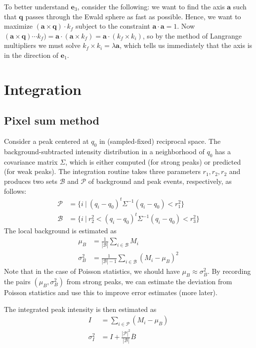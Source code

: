 \documentclass{report}
\newcommand{\calP}{\mathcal{P}}
\newcommand{\calB}{\mathcal{B}}
\newcommand{\ba}{\mathbf{a}}
\newcommand{\be}{\mathbf{e}}
\newcommand{\bq}{\mathbf{q}}
\begin{document}
To better understand $\be_3$, consider the following: we want to find the axis $\ba$ such that $\bq$ passes through the Ewald sphere as fast as possible. Hence, we want to maximize $(\ba \times \bq) \cdot k_f$ subject to the constraint $\ba \cdot \ba = 1$.
Now $(\ba \times \bq) \cdots k_f) = \ba \cdot (\ba \times k_f) = \ba \cdot (k_f \times k_i)$, so by the method of Langrange multipliers we must solve $k_f \times k_i = \lambda \ba$, which tells us immediately that the axis is in the direction of $\be_1$.


\chapter{Integration}

\section{Pixel sum method}
Consider a peak centered at $q_0$ in (sampled-fixed) reciprocal space. The background-subtracted intensity distribution in a neighborhood of $q_0$ has a covariance matrix $\Sigma$, which is either computed (for strong peaks) or predicted (for weak peaks). The integration routine takes three parameters $r_1, r_2, r_2$ and produces
two sets $\calB$ and $\calP$ of background and peak events, respectively, as follows:
\begin{align*}
  \calP &= \{ i \ | \ (q_i-q_0)^t \Sigma^{-1} (q_i-q_0) < r_1^2 \} \\
  \calB &= \{ i \ | \ r_2^2 < (q_i-q_0)^t \Sigma^{-1} (q_i-q_0) < r_3^2 \}
\end{align*}
The local background is estimated as
\begin{align*}
  \mu_B &= \frac{1}{|\calB|} \sum_{i \in \calB} M_i \\
  \sigma^2_B &= \frac{1}{|\calB|-1} \sum_{i \in \calB} (M_i - \mu_B)^2
\end{align*}
Note that in the case of Poisson statistics, we should have $\mu_B \approx \sigma^2_B$. By recording the pairs $(\mu_B, \sigma^2_B)$ from strong peaks, we can estimate the deviation from Poisson statistics and use this to improve error estimates (more later).

The integrated peak intensity is then estimated as
\begin{align*}
  I &= \sum_{i \in \calP} (M_i - \mu_B) \\
  \sigma^2_I &= I + \frac{|\calP|^2}{|\calB|} \overline{B}
\end{align*}
\end{document}
